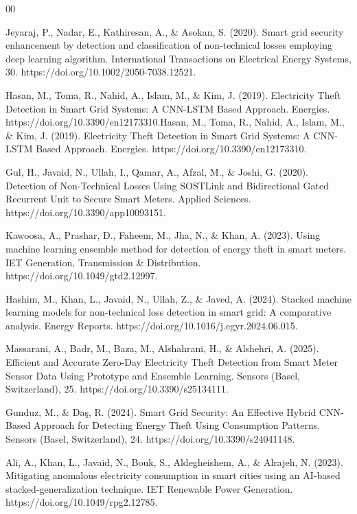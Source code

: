 \documentclass[journal]{IEEEtran}
\begin{document}
\begin{thebibliography}{00}

 Jeyaraj, P., Nadar, E., Kathiresan, A., \& Asokan, S. (2020). Smart grid security enhancement by detection and classification of non‐technical losses employing deep learning algorithm. International Transactions on Electrical Energy Systems, 30. https://doi.org/10.1002/2050-7038.12521.

 Hasan, M., Toma, R., Nahid, A., Islam, M., \& Kim, J. (2019). Electricity Theft Detection in Smart Grid Systems: A CNN-LSTM Based Approach. Energies. https://doi.org/10.3390/en12173310.Hasan, M., Toma, R., Nahid, A., Islam, M., \& Kim, J. (2019). Electricity Theft Detection in Smart Grid Systems: A CNN-LSTM Based Approach. Energies. https://doi.org/10.3390/en12173310.

 Gul, H., Javaid, N., Ullah, I., Qamar, A., Afzal, M., \& Joshi, G. (2020). Detection of Non-Technical Losses Using SOSTLink and Bidirectional Gated Recurrent Unit to Secure Smart Meters. Applied Sciences. https://doi.org/10.3390/app10093151.

 Kawoosa, A., Prashar, D., Faheem, M., Jha, N., \& Khan, A. (2023). Using machine learning ensemble method for detection of energy theft in smart meters. IET Generation, Transmission \& Distribution. https://doi.org/10.1049/gtd2.12997.

 Hashim, M., Khan, L., Javaid, N., Ullah, Z., \& Javed, A. (2024). Stacked machine learning models for non-technical loss detection in smart grid: A comparative analysis. Energy Reports. https://doi.org/10.1016/j.egyr.2024.06.015.

 Massarani, A., Badr, M., Baza, M., Alshahrani, H., \& Alshehri, A. (2025). Efficient and Accurate Zero-Day Electricity Theft Detection from Smart Meter Sensor Data Using Prototype and Ensemble Learning. Sensors (Basel, Switzerland), 25. https://doi.org/10.3390/s25134111.

 Gunduz, M., \& Daş, R. (2024). Smart Grid Security: An Effective Hybrid CNN-Based Approach for Detecting Energy Theft Using Consumption Patterns. Sensors (Basel, Switzerland), 24. https://doi.org/10.3390/s24041148.

 Ali, A., Khan, L., Javaid, N., Bouk, S., Aldegheishem, A., \& Alrajeh, N. (2023). Mitigating anomalous electricity consumption in smart cities using an AI‐based stacked‐generalization technique. IET Renewable Power Generation. https://doi.org/10.1049/rpg2.12785.


\end{thebibliography}
\end{document}
